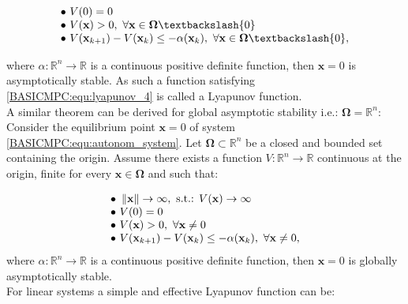     \begin{equation}
        \begin{array}{l}
                \bullet\textnormal{ } V(0)=0\\
                \bullet\textnormal{ } V(\textbf{x})>0,\textnormal{ }\forall\textbf{x}\in\boldsymbol{\Omega}\textbackslash\{0\}\\
                \bullet\textnormal{ } V(\textbf{x}_{k+1})-V(\textbf{x}_{k})\leq-\alpha(\textbf{x}_k),\textnormal{ }\forall\textbf{x}\in\boldsymbol{\Omega}\textbackslash\{0\},
            \end{array}
            \label{BASICMPC:equ:lyapunov_4_1}
        \end{equation}
        
     where $\alpha:\mathbb{R}^n\rightarrow\mathbb{R}$ is a continuous positive definite function, then $\textbf{x}=0$ is asymptotically stable. As such a function satisfying \ref{BASICMPC:equ:lyapunov_4} is called a Lyapunov function.\\
     A similar theorem can be derived for global asymptotic stability i.e.: $\boldsymbol{\Omega}=\mathbb{R}^n$:
     Consider the equilibrium point $\textbf{x}=0$ of system \ref{BASICMPC:equ:autonom_system}. Let $\boldsymbol{\Omega}\subset\mathbb{R}^n$ be a closed and bounded set containing the origin. Assume there exists a function $V:\mathbb{R}^n\rightarrow\mathbb{R}$ continuous at the origin, finite for every $\textbf{x}\in\boldsymbol{\Omega}$ and such that:
     
     \begin{equation}
        \begin{array}{l}
                \bullet\textnormal{ }\left\lVert\textbf{x}\right\rVert\rightarrow\infty,\textnormal{ s.t.: }V(\textbf{x})\rightarrow\infty\\
                \bullet\textnormal{ } V(0)=0\\
                \bullet\textnormal{ } V(\textbf{x})>0,\textnormal{ }\forall\textbf{x}\neq0\\
                \bullet\textnormal{ } V(\textbf{x}_{k+1})-V(\textbf{x}_{k})\leq-\alpha(\textbf{x}_k),\textnormal{ }\forall\textbf{x}\neq0,
            \end{array}
            \label{BASICMPC:equ:lyapunov_4_2}
        \end{equation}
     where $\alpha:\mathbb{R}^n\rightarrow\mathbb{R}$ is a continuous positive definite function, then $\textbf{x}=0$ is globally asymptotically stable.\\
     For linear systems a simple and effective Lyapunov function can be:
     
